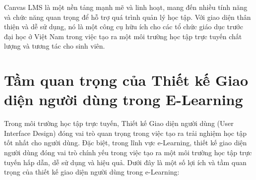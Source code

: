 \documentclass[../Thesis.tex]{subfiles}
\begin{document}
Canvas LMS là một nền tảng mạnh mẽ và linh hoạt, mang đến nhiều tính năng và chức năng quan trọng để hỗ trợ quá trình quản lý học tập. Với giao diện thân thiện và dễ sử dụng, nó là một công cụ hữu ích cho các tổ chức giáo dục trước đại học ở Việt Nam trong việc tạo ra một môi trường học tập trực tuyến chất lượng và tương tác cho sinh viên.

\section{Tầm quan trọng của Thiết kế Giao diện người dùng trong E-Learning}
Trong môi trường học tập trực tuyến, Thiết kế Giao diện người dùng (User Interface Design) đóng vai trò quan trọng trong việc tạo ra trải nghiệm học tập tốt nhất cho người dùng. Đặc biệt, trong lĩnh vực e-Learning, thiết kế giao diện người dùng đóng vai trò chính yếu trong việc tạo ra một môi trường học tập trực tuyến hấp dẫn, dễ sử dụng và hiệu quả. Dưới đây là một số lợi ích và tầm quan trọng của thiết kế giao diện người dùng trong e-Learning:
\end{document}
